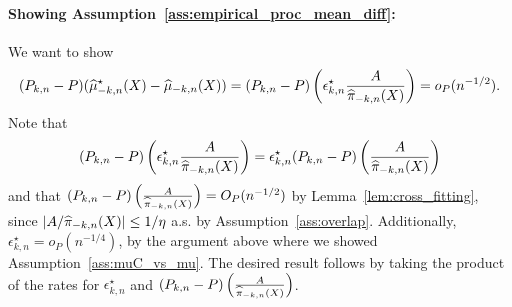 \paragraph{Showing Assumption~\ref{ass:empirical_proc_mean_diff}:}
We want to show
$$
(P_{k,n}-P)(  \widehat{\mu}_{-k,n}^\star(X)- \widehat{\mu}_{-k,n}(X)) = 
(P_{k,n}-P) \left(\epsilon^\star_{k,n}\frac{A}{\widehat{\pi}_{-k,n}(X)}\right) = o_P(n^{-1/2}).
$$
Note that
$$(P_{k,n}-P) \left(\epsilon^\star_{k,n}\frac{A}{\widehat{\pi}_{-k,n}(X)}\right)
=\epsilon^\star_{k,n}(P_{k,n}-P)
\left(\frac{A}{\widehat{\pi}_{-k,n}(X)}\right)
$$
and that $(P_{k,n}-P)
\left(\frac{A}{\widehat{\pi}_{-k,n}(X)}\right)=O_P(n^{-1/2})$ by Lemma~\ref{lem:cross_fitting},
since $|A/\widehat{\pi}_{-k,n}(X)|\leq 1/\eta$ a.s. by Assumption~\ref{ass:overlap}. 
Additionally, $\epsilon^\star_{k,n}=o_P(n^{-1/4})$, by the argument above where we showed  Assumption~\ref{ass:muC_vs_mu}. 
The desired result follows by taking the product of the rates for $\epsilon^\star_{k,n}$ and $(P_{k,n}-P)
\left(\frac{A}{\widehat{\pi}_{-k,n}(X)}\right)$. %




